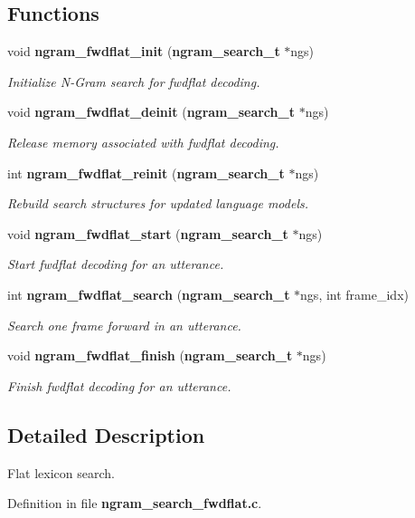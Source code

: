 \subsection*{\-Functions}
\begin{DoxyCompactItemize}
\item 
void {\bf ngram\-\_\-fwdflat\-\_\-init} ({\bf ngram\-\_\-search\-\_\-t} $\ast$ngs)\label{ngram__search__fwdflat_8c_ad4b8ebd904c77f8a28f59cd5ca2c8307}

\begin{DoxyCompactList}\small\item\em \-Initialize \-N-\/\-Gram search for fwdflat decoding. \end{DoxyCompactList}\item 
void {\bf ngram\-\_\-fwdflat\-\_\-deinit} ({\bf ngram\-\_\-search\-\_\-t} $\ast$ngs)\label{ngram__search__fwdflat_8c_a8faf467f90162a7273b23304fc6e8586}

\begin{DoxyCompactList}\small\item\em \-Release memory associated with fwdflat decoding. \end{DoxyCompactList}\item 
int {\bf ngram\-\_\-fwdflat\-\_\-reinit} ({\bf ngram\-\_\-search\-\_\-t} $\ast$ngs)\label{ngram__search__fwdflat_8c_aa4879c06ddbc455a6f355084a9c574b4}

\begin{DoxyCompactList}\small\item\em \-Rebuild search structures for updated language models. \end{DoxyCompactList}\item 
void {\bf ngram\-\_\-fwdflat\-\_\-start} ({\bf ngram\-\_\-search\-\_\-t} $\ast$ngs)\label{ngram__search__fwdflat_8c_a763c2c7aaa5d7f9c5107af73552a2149}

\begin{DoxyCompactList}\small\item\em \-Start fwdflat decoding for an utterance. \end{DoxyCompactList}\item 
int {\bf ngram\-\_\-fwdflat\-\_\-search} ({\bf ngram\-\_\-search\-\_\-t} $\ast$ngs, int frame\-\_\-idx)\label{ngram__search__fwdflat_8c_ae77ef21ae92dbcc4b14f40469fbd4307}

\begin{DoxyCompactList}\small\item\em \-Search one frame forward in an utterance. \end{DoxyCompactList}\item 
void {\bf ngram\-\_\-fwdflat\-\_\-finish} ({\bf ngram\-\_\-search\-\_\-t} $\ast$ngs)\label{ngram__search__fwdflat_8c_ac855cf540ac4acdfa320629720ded6fe}

\begin{DoxyCompactList}\small\item\em \-Finish fwdflat decoding for an utterance. \end{DoxyCompactList}\end{DoxyCompactItemize}


\subsection{\-Detailed \-Description}
\-Flat lexicon search. 

\-Definition in file {\bf ngram\-\_\-search\-\_\-fwdflat.\-c}.

